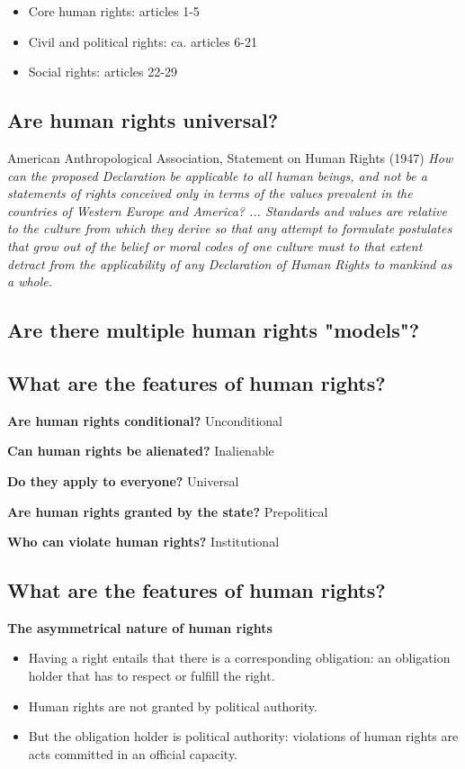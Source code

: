 \begin{itemize}
    \item Core human rights: articles 1-5
    \item Civil and political rights: ca. articles 6-21
    \item Social rights: articles 22-29
\end{itemize}

\subsection{Are human rights universal?}

American Anthropological Association, Statement on Human Rights (1947)
\textit{How can the proposed Declaration be applicable to all human beings,
and not be a statements of rights conceived only in terms of the values
prevalent in the countries of Western Europe and America? ... Standards and
values are relative to the culture from which they derive so that any
attempt to formulate postulates that grow out of the belief or moral codes
of one culture must to that extent detract from the applicability of any
Declaration of Human Rights to mankind as a whole.}

\subsection{Are there multiple human rights "models"?}

\subsection{What are the features of human rights?}

\textbf{Are human rights conditional?} Unconditional

\textbf{Can human rights be alienated?} Inalienable

\textbf{Do they apply to everyone?} Universal

\textbf{Are human rights granted by the state?} Prepolitical

\textbf{Who can violate human rights?} Institutional

\subsection{What are the features of human rights?}

\textbf{The asymmetrical nature of human rights}
\begin{itemize}
    \item Having a right entails that there is a corresponding obligation:
    an obligation holder that has to respect or fulfill the right.
    \item Human rights are not granted by political authority.
    \item But the obligation holder is political authority: violations of
    human rights are acts committed in an official capacity.
\end{itemize}


